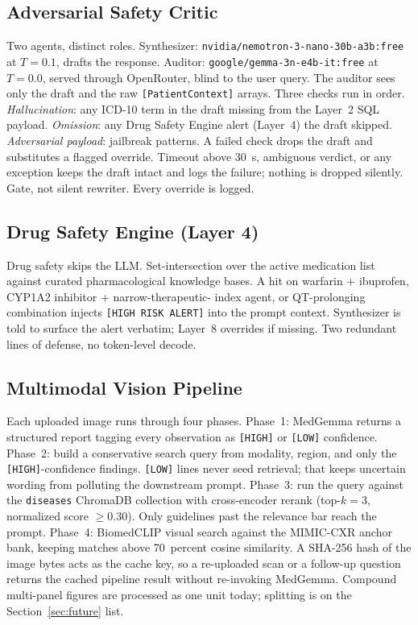 \documentclass[twocolumn,10pt,main=USenglish]{asmeconf}
\begin{document}
\subsection{Adversarial Safety Critic}
Two agents, distinct roles. Synthesizer:
\texttt{nvidia/nemotron-3-nano-30b-a3b:free} at $T{=}\num{0.1}$,
drafts the response. Auditor:
\texttt{google/gemma-3n-e4b-it:free} at $T{=}\num{0.0}$, served
through OpenRouter, blind to the user query. The auditor sees only
the draft and the raw \texttt{[PatientContext]} arrays. Three
checks run in order. \emph{Hallucination}: any ICD-10 term in the
draft missing from the Layer~2 SQL payload. \emph{Omission}: any
Drug Safety Engine alert (Layer~4) the draft skipped.
\emph{Adversarial payload}: jailbreak patterns. A failed check
drops the draft and substitutes a flagged override. Timeout above
\num{30}~s, ambiguous verdict, or any exception keeps the draft
intact and logs the failure; nothing is dropped silently. Gate, not
silent rewriter. Every override is logged.

\subsection{Drug Safety Engine (Layer 4)}
Drug safety skips the LLM. Set-intersection over the active
medication list against curated pharmacological knowledge bases.
A hit on warfarin + ibuprofen, CYP1A2 inhibitor + narrow-therapeutic-
index agent, or QT-prolonging combination injects
\texttt{[HIGH RISK ALERT]} into the prompt context. Synthesizer is
told to surface the alert verbatim; Layer~8 overrides if missing.
Two redundant lines of defense, no token-level decode.

\subsection{Multimodal Vision Pipeline}
Each uploaded image runs through four phases. Phase~1: MedGemma
returns a structured report tagging every observation as
\texttt{[HIGH]} or \texttt{[LOW]} confidence. Phase~2: build a
conservative search query from modality, region, and only the
\texttt{[HIGH]}-confidence findings. \texttt{[LOW]} lines never
seed retrieval; that keeps uncertain wording from polluting the
downstream prompt. Phase~3: run the query against the
\texttt{diseases} ChromaDB collection with cross-encoder rerank
(top-$k{=}3$, normalized score $\geq 0.30$). Only guidelines past
the relevance bar reach the prompt. Phase~4: BiomedCLIP visual
search against the MIMIC-CXR anchor bank, keeping matches above
\num{70}~percent cosine similarity. A SHA-256 hash of the image
bytes acts as the cache key, so a re-uploaded scan or a follow-up
question returns the cached pipeline result without re-invoking
MedGemma. Compound multi-panel figures are processed as one unit
today; splitting is on the Section~\ref{sec:future} list.
\end{document}
